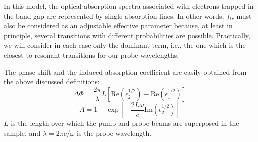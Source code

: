 \documentclass[aps,prb,reprint]{revtex4-2}
\begin{document}
In this model, the optical absorption spectra associated with electrons trapped in the band gap are represented by single absorption lines. In other words, $f_{tr}$ must also be considered as an adjustable effective parameter because, at least in principle, several transitions with different probabilities are possible. Practically, we will consider in each case only the dominant term, i.e., the one which is the closest to resonant transitions for our probe wavelengths.

The phase shift and the induced absorption coefficient are easily obtained from the above discussed definitions:
\begin{equation}
\Delta \Phi = \frac{2\pi}{\lambda} L \left[ \text{Re}(\epsilon_2^{1/2}) - \text{Re}(\epsilon_1^{1/2}) \right]
\end{equation}
\begin{equation}
A = 1 - \exp \left[ -\frac{2L\omega}{c} \text{Im}(\epsilon_2^{1/2}) \right]
\end{equation}
 $L$ is the length over which the pump and probe beams are superposed in the sample, and $\lambda = 2\pi c / \omega$ is the probe wavelength.
\end{document}
